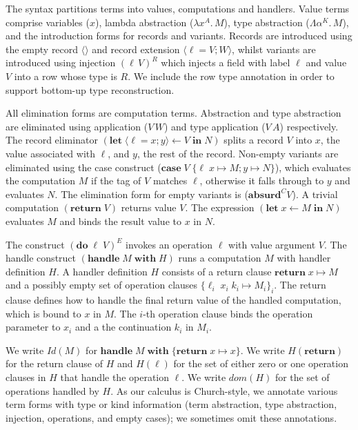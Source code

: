 \documentclass[mscres,cdtppar,twoside,openright,logo,rightchapter,normalheadings]{infthesis}
\theoremstyle{definition}
\newcommand{\revto}{\ensuremath{\leftarrow}}
\newcommand{\keyw}[1]{\textbf{#1}}
\newcommand{\Handle}{\keyw{handle}}
\newcommand{\With}{\keyw{with}}
\newcommand{\Let}{\keyw{let}}
\newcommand{\In}{\keyw{in}}
\newcommand{\Do}{\keyw{do}}
\newcommand{\Return}{\keyw{return}}
\newcommand{\Case}{\keyw{case}}
\newcommand{\Absurd}{\keyw{absurd}}
\newcommand{\Record}[1]{\ensuremath{\langle #1 \rangle}}
\begin{document}
The syntax partitions terms into values, computations and
handlers. 
%
Value terms comprise variables ($x$), %
lambda abstraction ($\lambda x^A . \, M$), type abstraction ($\Lambda
\alpha^K . \, M$), and the introduction forms for records and
variants. Records are introduced using the empty record $\Record{}$
and record extension $\Record{\ell = V; W}$, whilst variants are
introduced using injection $(\ell\, V)^R$ which injects a field with
label $\ell$ and value $V$ into a row whose type is $R$. We include
the row type annotation in order to support bottom-up type
reconstruction.

All elimination forms are computation terms. Abstraction and type
abstraction are eliminated using application ($V\,W$) and type
application ($V\,A$) respectively.
%
The record eliminator $(\Let \; \Record{\ell=x;y} \revto V \; \In \;
N)$ splits a record $V$ into $x$, the value associated with $\ell$,
and $y$, the rest of the record. Non-empty variants are eliminated
using the case construct ($\Case\; V\; \{\ell\; x \mapsto M; y \mapsto
N\}$), which evaluates the computation $M$ if the tag of $V$ matches
$\ell$, otherwise it falls through to $y$ and evaluates $N$.  The
elimination form for empty variants is ($\Absurd^C V$). A trivial
computation $(\Return\;V)$ returns value $V$. The expression $(\Let \;
x \revto M \; \In \; N)$ evaluates $M$ and binds the result value to
$x$ in $N$.

The construct $(\Do \; \ell \; V)^E$ invokes an operation $\ell$ with
value argument $V$. The handle construct $(\Handle \; M \; \With \;
H)$ runs a computation $M$ with handler definition $H$. A handler
definition $H$ consists of a return clause $\Return \; x \mapsto M$
and a possibly empty set of operation clauses $\{\ell_i \; x_i \; k_i
\mapsto M_i\}_i$. The return clause defines how to handle the final
return value of the handled computation, which is bound to $x$ in $M$.
%
The $i$-th operation clause binds the operation parameter to $x_i$ and
a the continuation $k_i$ in $M_i$.

We write $Id(M)$ for $\Handle \;M\; \With \; \{\Return\;x \mapsto
x\}$.
%
We write $H(\Return)$ for the return clause of $H$ and $H(\ell)$ for
the set of either zero or one operation clauses in $H$ that handle the
operation $\ell$. We write $dom(H)$ for the set of operations handled
by $H$.
%
As our calculus is Church-style, we annotate various term forms with
type or kind information (term abstraction, type abstraction,
injection, operations, and empty cases); we sometimes omit these
annotations.
\end{document}

